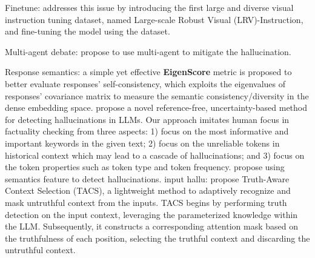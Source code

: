 Finetune:
\cite{liu2024mitigating} addresses this issue by introducing the first large and diverse visual instruction tuning dataset, named Large-scale Robust Visual (LRV)-Instruction, and fine-tuning the model using the dataset.

Multi-agent debate:
\cite{hong2024metagpt} propose to use multi-agent to mitigate the hallucination.


Response semantics:
\cite{chen2024inside} a simple yet effective \textbf{EigenScore} metric is proposed to better evaluate responses' self-consistency, which exploits the eigenvalues of responses' covariance matrix to measure the semantic consistency/diversity in the dense embedding space.
\cite{zhang2023enhancing} propose a novel reference-free, uncertainty-based method for detecting hallucinations in LLMs. Our approach imitates human focus in factuality checking from three aspects: 1) focus on the most informative and important keywords in the given text; 2) focus on the unreliable tokens in historical context which may lead to a cascade of hallucinations; and 3) focus on the token properties such as token type and token frequency.
\cite{sadat2023delucionqa} propose using semantics feature to detect hallucinations.
input hallu: \cite{yu2024truth} propose Truth-Aware Context Selection (TACS), a lightweight method to adaptively recognize and mask untruthful context from the inputs. TACS begins by performing truth detection on the input context, leveraging the parameterized knowledge within the LLM. Subsequently, it constructs a corresponding attention mask based on the truthfulness of each position, selecting the truthful context and discarding the untruthful context.

